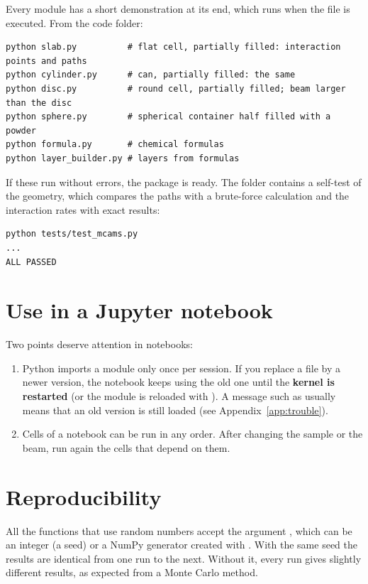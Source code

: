 Every module has a short demonstration at its end, which runs when the file is executed. From the code folder:
\begin{lstlisting}[style=shell]
python slab.py          # flat cell, partially filled: interaction points and paths
python cylinder.py      # can, partially filled: the same
python disc.py          # round cell, partially filled; beam larger than the disc
python sphere.py        # spherical container half filled with a powder
python formula.py       # chemical formulas
python layer_builder.py # layers from formulas
\end{lstlisting}
If these run without errors, the package is ready. The folder  contains a self-test of the
geometry, which compares the paths with a brute-force calculation and the interaction rates with exact results:
\begin{lstlisting}[style=shell]
python tests/test_mcams.py
...
ALL PASSED
\end{lstlisting}

\section{Use in a Jupyter notebook}

Two points deserve attention in notebooks:
\begin{enumerate}
  \item Python imports a module only once per session. If you replace a file by a newer version, the notebook
        keeps using the old one until the \textbf{kernel is restarted} (or the module is reloaded with
        ). A message such as 
        usually means that an old version is still loaded (see Appendix~\ref{app:trouble}).
  \item Cells of a notebook can be run in any order. After changing the sample or the beam, run again the cells that depend on them.
\end{enumerate}

\section{Reproducibility}

All the functions that use random numbers accept the argument , which can be an integer
(a seed) or a NumPy generator created with . With the same seed the
results are identical from one run to the next. Without it, every run gives slightly different
results, as expected from a Monte Carlo method.
